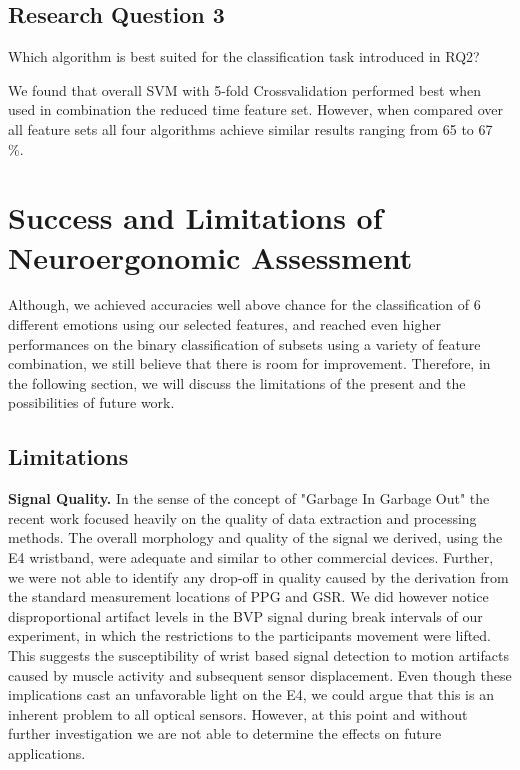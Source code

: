 \subsection{Research Question 3}  
Which algorithm is best suited for the classification task introduced in RQ2?

We found that overall SVM with 5-fold Crossvalidation performed best when used in combination the reduced time feature set. However, when compared over all feature sets all four algorithms achieve similar results ranging from 65 to 67 \%.

\section{Success and Limitations of Neuroergonomic Assessment}
Although, we achieved accuracies well above chance for the classification of 6 different emotions using our selected features, and reached even higher performances on the binary classification of subsets using a variety of feature combination, we still believe that there is room for improvement. Therefore, in the following section, we will discuss the limitations of the present and the possibilities of future work.

\subsection{Limitations}\label{lim}
\textbf{Signal Quality.}
In the sense of the concept of "Garbage In Garbage Out" the recent work focused heavily on the quality of data extraction and processing methods. The overall morphology and quality of the signal we derived, using the E4 wristband, were adequate and similar to other commercial devices. Further, we were not able to identify any drop-off in quality caused by the derivation from the standard measurement locations of PPG and GSR. We did however notice disproportional artifact levels in the BVP signal during break intervals of our experiment, in which the restrictions to the participants movement were lifted. This suggests the susceptibility of wrist based signal detection to motion artifacts caused by muscle activity and subsequent sensor displacement. Even though these implications cast an unfavorable light on the E4, we could argue that this is an inherent problem to all optical sensors. However, at this point and without further investigation we are not able to determine the effects on future applications.\\[10pt]

